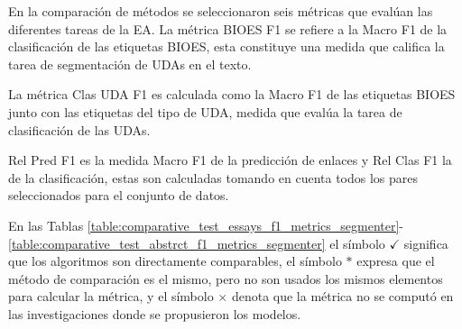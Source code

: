 \documentclass{rcci} %
\begin{document}
En la comparaci\'on de m\'etodos se seleccionaron seis m\'etricas que eval\'uan las diferentes 
tareas de la EA. La m\'etrica BIOES F1 se refiere 
a la Macro F1 de la clasificaci\'on de las etiquetas BIOES, esta constituye una medida
que califica la tarea de segmentaci\'on de UDAs en el texto. 

La m\'etrica Clas UDA F1 es 
calculada como la Macro F1 de las etiquetas BIOES junto con las etiquetas del tipo de 
UDA, medida que eval\'ua la tarea de clasificaci\'on de las UDAs. 

Rel Pred F1 es la medida 
Macro F1 de la predicci\'on de enlaces y Rel Clas F1 la de la clasificaci\'on, estas 
son calculadas tomando en cuenta todos los pares seleccionados para el conjunto de 
datos. 

En las Tablas \ref{table:comparative_test_essays_f1_metrics_segmenter}-\ref{table:comparative_test_abstrct_f1_metrics_segmenter} el s\'imbolo $\checkmark$ significa 
que los algoritmos son directamente comparables, el s\'imbolo
$*$ expresa que el m\'etodo de comparaci\'on es el mismo, pero no son usados los mismos 
elementos para calcular la m\'etrica, y el s\'imbolo $\times$ denota que la m\'etrica no 
se comput\'o en las investigaciones donde se propusieron los modelos.


\begin{table}[!ht]
	\centering
	\caption{\fontsize{11}{12}\selectfont M\'etricas comparativas del corpus Ensayos Persuasivos.}
	\label{table:comparative_test_essays_f1_metrics_segmenter}
	\begin{threeparttable}[b]
		\fontsize{9}{11}
	\end{threeparttable}
\end{table}
\end{document}
